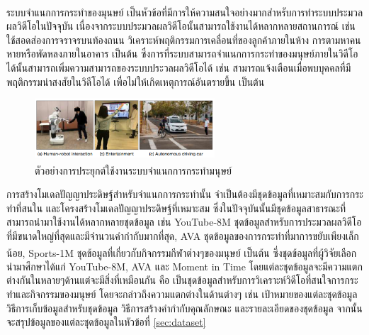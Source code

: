 ระบบจำแนกการกระทำของมุนษย์\textsuperscript{\cite{ma2017less}} เป็นหัวข้อที่มีการให้ความสนใจอย่างมากสำหรับการทำระบบประมวลผลวิดีโอในปัจจุบัน เนื่องจากระบบประมวลผลวิดีโอนั้นสามารถใช้งานได้หลากหลายสถานการณ์ เช่น ใช้สอดส่องการจราจรบนท้องถนน
วิเคราะห์พฤติกรรมการเคลื่อนที่ของลูกค้าภายในห้าง การตามหาคนหายหรือพัดหลงภายในอาคาร เป็นต้น ซึ่งการที่ระบบสามารถจำแนกการกระทำของมนุษย์ภายในวิดีโอได้นั้นสามารถเพิ่มความสามารถของระบบประวลผลวิดีโอได้
เช่น สามารถแจ้งเตือนเมื่อพบบุคคลที่มีพฤติกรรมน่าสงสัยในวิดีโอได้ เพื่อไม่ให้เกิดเหตุการณ์อันตรายขึ้น เป็นต้น

\begin{figure}[!ht]
	\centering
	\includegraphics[width=0.6\textwidth]{chapter2/images/video_analytics_ex.png}
	\caption[ตัวอย่างการประยุกต์ใช้งานระบบจำแนกการกระทำมนุษย์]{ตัวอย่างการประยุกต์ใช้งานระบบจำแนกการกระทำมนุษย์\textsuperscript{\cite{kong2018human}}}
	\label{fig:actioncls_ex}
\end{figure}

การสร้างโมเดลปัญญาประดิษฐ์สำหรับจำแนกการกระทำนั้น จำเป็นต้องมีชุดข้อมูลที่เหมาะสมกับการกระทำที่สนใน และโครงสร้างโมเดลปัญญาประดิษฐ์ที่เหมาะสม
ซึ่งในปัจจุบันนั้นมีชุดข้อมูลสาธารณะที่สามารถนำมาใช้งานได้หลากหลายชุดข้อมูล เช่น YouTube-8M ชุดข้อมูลสำหรับการประมวลผลวิดีโอที่มีขนาดใหญ่ที่สุดและมีจำนวนคำกำกับมากที่สุด, 
AVA ชุดข้อมูลของการกระทำที่มาการขยับเพียงเล็กน้อย, Sports-1M\textsuperscript{\cite{karpathy2014large}} ชุดข้อมูลที่เกี่ยวกับกิจกรรมกีฬาต่างๆของมนุษย์ เป็นต้น ซึ่งชุดข้อมูลที่ผู้วิจัยเลือกนำมาศึกษาได้แก่ YouTube-8M, AVA และ Moment in Time
โดยแต่ละชุดข้อมูลจะมีความแตกต่างกันในหลายๆด้านแต่จะมีสิ่งที่เหมือนกัน คือ เป็นชุดข้อมูลสำหรับการวิเคราะห์วิดีโอที่สนใจการกระทำและกิจกรรมของมนุษย์ โดยจะกล่าวถึงความแตกต่างในด้านต่างๆ 
เช่น เป้าหมายของแต่ละชุดข้อมูล วิธีการเก็บข้อมูลสำหรับชุดข้อมูล วิธีการสร้างคำกำกับคุณลักษณะ และรายละเอียดของชุดข้อมูล จากนั้นจะสรุปข้อมูลของแต่ละชุดข้อมูลในหัวข้อที่ \ref{sec:dataset}